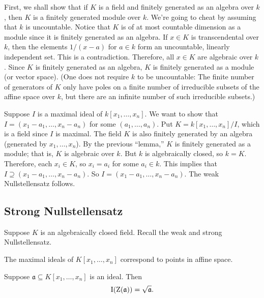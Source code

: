 \documentclass[11pt, oneside,margin=1in]{article}
\begin{document}
First, we shall show that if $K$ is a field and finitely generated as an algebra over $k$, then $K$ is a finitely generated module over $k$. We're going to cheat by assuming that $k$ is uncountable. Notice that $K$ is of at most countable dimension as a module since it is finitely generated as an algebra. If $x\in K$ is transcendental over $k$, then the elements $1/(x-a)$ for $a\in k$ form an uncountable, linearly independent set. This is a contradiction. Therefore, all $x\in K$ are algebraic over $k$. Since $K$ is finitely generated as an algebra, $K$ is finitely generated as a module (or vector space). (One does not require $k$ to be uncountable: The finite number of generators of $K$ only have poles on a finite number of irreducible subsets of the affine space over $k$, but there are an infinite number of such irreducible subsets.)

Suppose $I$ is a maximal ideal of $k[x_1,\hdots, x_n]$. We want to show that $I = (x_1-a_1,\hdots, x_n-a_n)$ for some $(a_1,\hdots, a_n)$. Put $K = k[x_1,\hdots, x_n]/I$, which is a field since $I$ is maximal. The field $K$ is also finitely generated by an algebra (generated by $x_1,\hdots, x_n$). By  the previous ``lemma,'' $K$ is finitely generated as a module; that is, $K$ is algebraic over $k$. But $k$ is algebraically closed, so $k=K$. Therefore, each $x_i\in K$, so $x_i=a_i$ for some $a_i\in k$. This implies that $I\supseteq (x_1-a_1,\hdots, x_n-a_n)$. So $I = (x_1-a_1,\hdots, x_n-a_n)$. The weak Nullstellensatz follows.


\subsection{Strong Nullstellensatz}

Suppose $K$ is an algebraically closed field. Recall the weak and strong Nullstellensatz.

\begin{theorem}\label{}\index{}\text{}
The maximal ideals of $K[x_1,\hdots, x_n]$ correspond to points in affine space.
\end{theorem}

\begin{theorem}\label{}\index{}\text{}
Suppose $\mathfrak{a}\subseteq K[x_1,\hdots, x_n]$ is an ideal. Then 
\begin{align*}
	\operatorname{I}(\operatorname{Z}(\mathfrak{a})) = \sqrt{\mathfrak{a}} .
\end{align*}
\end{theorem}
\end{document}
